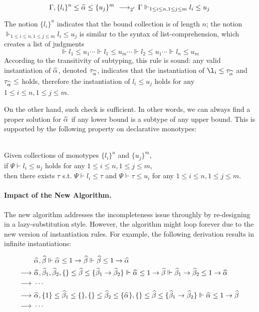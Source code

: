 $$
\Gm, \{l_i\}^n \le \al \le \{u_j\}^m \rrule{2'} \Gm \Vdash_{1 \le i \le n, 1 \le j \le m} l_i \le u_j
$$

The notion $\{l_i\}^n$ indicates that the bound collection is of length $n$;
the notion
$\Vdash_{1 \le i \le n, 1 \le j \le m} l_i \le u_j$
is similar to the syntax of list-comprehension, which creates a list of judgments
$$\Vdash l_1 \le u_1 \cdots \Vdash l_1 \le u_m \cdots \Vdash l_2 \le u_1
\cdots \Vdash l_n \le u_m$$
According to the transitivity of subtyping, this rule is sound:
any valid instantiation of $\al$, denoted $\tau_{\al}$, indicates that
the instantiation of $\l_i \le \tau_{\al}$ and $\tau_{\al} \le $ holds,
therefore the instantiation of $l_i \le u_j$ holds for any $1 \le i \le n, 1 \le j \le m$.

On the other hand, such check is sufficient. In other words,
we can always find a proper solution for $\al$ if any lower bound
is a subtype of any upper bound.
This is supported by the following property on declarative monotypes:
\begin{lemma}~\\
    Given collections of monotypes $\{l_i\}^n$ and $\{u_j\}^m$,\\
    if $\Psi \vdash l_i \le u_j$ holds for any $1 \le i \le n, 1 \le j \le m$,\\
    then there exists $\tau$ s.t. $\Psi \vdash l_i \le \tau$ and $\Psi \vdash \tau \le u_i$
    for any $1 \le i \le n, 1 \le j \le m$.
\end{lemma}

\paragraph{Impact of the New Algorithm.}

The new algorithm addresses the incompleteness issue throughly by
re-designing in a lazy-substitution style.
However, the algorithm might loop forever due to the
new version of instantiation rules.
For example, the following derivation results in infinite instantiations:

\begin{gather*}
    \begin{aligned}
     & \al, \bt \Vdash \al \le 1 \to \bt \Vdash \bt \le 1 \to \al\\
\rto~& \al, \bt[1], \bt[2], \{\} \le \bt \le \{\bt[1] \to \bt[2]\}
        \Vdash \al \le 1 \to \bt \Vdash \bt[1] \to \bt[2] \le 1 \to \al\\
\rto~& \cdots\\
\rto~& \al, \{1\} \le \bt[1] \le \{\}, \{\} \le \bt[2] \le \{\al\},
        \{\} \le \bt \le \{\bt[1] \to \bt[2]\}
        \Vdash \al \le 1 \to \bt\\
\rto~& \cdots\\
    \end{aligned}
\end{gather*}

